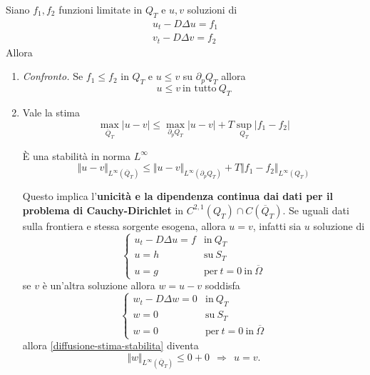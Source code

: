 \documentclass[10pt,a4paper,twoside,openright]{book}
\begin{document}
Siano $f_{1},f_{2}$ funzioni limitate in $Q_{T}$ e $u,v$ soluzioni di
\begin{gather*}
    u_{t} -D\Delta u=f_{1}\\
    v_{t} -D\Delta v=f_{2}
\end{gather*}
Allora
\begin{enumerate}
    \item \textit{Confronto.} Se $f_{1} \leqslant f_{2}$ in $Q_{T}$ e $u\leqslant v$ su $\partial _{p} Q_{T}$ allora
          \begin{equation*}
              u\leqslant v\ \text{in tutto} \ Q_{T}
          \end{equation*}
    \item Vale la stima
          \begin{equation*}
              \max_{\overline{Q}_{T}}| u-v| \leqslant \max_{\partial _{p} Q_{T}}| u-v| +T\sup _{Q_{T}}| f_{1} -f_{2}|
          \end{equation*}

          È una stabilità in norma $L^{\infty }$
          \begin{equation*}
              \Vert u-v\Vert _{L^{\infty }(\overline{Q}_{T})} \leqslant \Vert u-v\Vert _{L^{\infty }(\partial _{p} Q_{T})} +T\Vert f_{1} -f_{2}\Vert _{L^{\infty }(Q_{T})}
              \label{diffusione-stima-stabilita}
          \end{equation*}

          Questo implica l'\textbf{unicità e la dipendenza continua dai dati per il problema di Cauchy-Dirichlet} in $C^{2,1}(Q_{T}) \cap C(\overline{Q}_{T})$. Se uguali dati sulla frontiera e stessa sorgente esogena, allora $u=v$, infatti sia $u$ soluzione di
          \begin{equation*}
              \begin{cases}
                  u_{t} -D\Delta u=f & \text{in} \ Q_{T}                                \\
                  u=h                & \text{su} \ S_{T}                                \\
                  u=g                & \text{per} \ t=0\ \text{in} \ \overline{\Omega }
              \end{cases}
          \end{equation*}se $v$ è un'altra soluzione allora $w=u-v$ soddisfa
          \begin{equation*}
              \begin{cases}
                  w_{t} -D\Delta w=0 & \text{in} \ Q_{T}                                \\
                  w=0                & \text{su} \ S_{T}                                \\
                  w=0                & \text{per} \ t=0\ \text{in} \ \overline{\Omega }
              \end{cases}
          \end{equation*}
          allora \eqref{diffusione-stima-stabilita} diventa
          \begin{equation*}
              \Vert w\Vert _{L^{\infty }(\overline{Q}_{T})} \leqslant 0+0\ \ \Rightarrow \ \ u=v.
          \end{equation*}
\end{enumerate}
\end{document}
